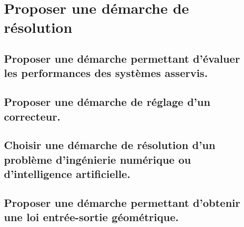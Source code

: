 \documentclass[10pt,fleqn]{article}
\newcommand{\repRel}{../..}
\newcommand{\repStyle}{\repRel/Style}
\newcommand{\td}{fichier_td}
\newcommand{\repExos}{\repRel/ExercicesCompetences}
\newcommand{\repExo}{dossier}
\begin{document}
\proffalse
\newpage
\def\xxchapitre{Résoudre}
\def\xxactivite{C}
\setcounter{section}{0}
\setcounter{numexo}{0}


\section{Proposer une démarche de résolution} 

\subsection{Proposer une démarche permettant d'évaluer les performances des systèmes asservis.} 

\begin{multicols}{2} 

\end{multicols}

\subsection{Proposer une démarche de réglage d'un correcteur.} 

\begin{multicols}{2} 

\renewcommand{\repExo}{\repExos/C1_ProposerDemarche/C1_02_ProposerDemarcheReglageCorrecteur/50_BancBalafre}
\renewcommand{\td}{50_BancBalafre}
\graphicspath{{\repStyle/png/}{\repExo/images/}}


\end{multicols}

\subsection{Choisir une démarche de résolution d’un problème d'ingénierie numérique ou d'intelligence artificielle. } 

\begin{multicols}{2} 

\end{multicols}

\subsection{Proposer une démarche permettant d'obtenir une loi entrée-sortie géométrique. } 

\begin{multicols}{2} 

\end{multicols}
\end{document}
